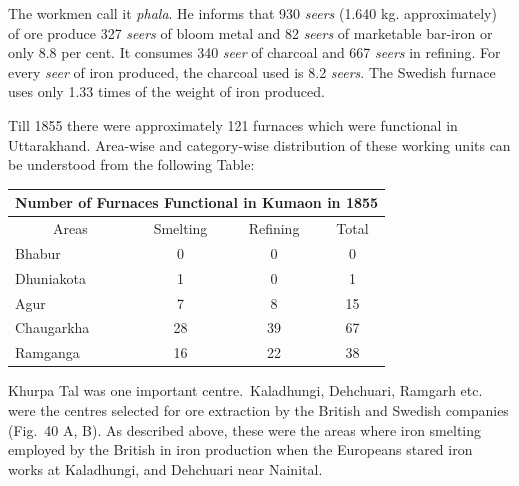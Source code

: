 The workmen call it {\it phala}. He informs that 930 {\it seers} (1.640 kg. approximately) of ore produce 327 {\it seers} of bloom metal and 82 {\it seers} of marketable bar-iron or only 8.8 per cent. It consumes 340 {\it seer} of charcoal and 667 {\it seers} in refining. For every {\it seer} of iron produced, the charcoal used is 8.2 {\it seers}. The Swedish furnace uses only 1.33 times of the weight of iron produced. 

Till 1855 there were approximately 121 furnaces which were functional in Uttarakhand. Area-wise and category-wise distribution of these working units can be understood from the following Table:

\vspace{-.3cm}

{\fontsize{8}{10}\selectfont\begin{longtable}{|l|c|c|c|}
\multicolumn{4}{c}{\textbf{Number of Furnaces Functional in Kumaon in 1855}}\\[2pt]
\hline 
\multicolumn{1}{|c|}{Areas} & Smelting & Refining & Total\\
\hline
Bhabur & 0 & 0 & 0\\
\hline
Dhuniakota & 1 & 0 &1\\
\hline
Agur & 7 & 8 &15\\
\hline
Chaugarkha & 28 & 39 & 67\\
\hline
Ramganga & 16 & 22 & 38\\
\hline
\end{longtable}}

\vspace{-.3cm}

Khurpa Tal was one important centre.~Kaladhungi, Dehchuari, Ramgarh etc. were the centres selected for ore extraction by the British and Swedish companies (Fig.~40 A, B). As described above, these were the areas where iron smelting employed by the British in iron production when the Europeans stared iron works at Kaladhungi, and Dehchuari near Nainital.


